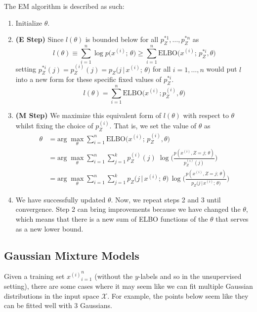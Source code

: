 \begin{definition}
    The EM algorithm is described as such: 
    \begin{enumerate}
      \item Initialize $\theta$.
      \item \textbf{(E Step)} Since $l(\theta)$ is bounded below for all $p_Z^{*1}, \ldots, p_Z^{*n}$ as 
        \[l(\theta) \equiv \sum_{i=1}^n \log p\big( x^{(i)}; \, \theta\big) \geq \sum_{i=1}^n \text{ELBO}\big( x^{(i)}; \, p_Z^{*i}, \theta\big)\]
      setting $p_Z^{*i} (j) = p_Z^{(i)} (j) = p_Z \big(j\,|\, x^{(i)}; \, \theta\big)$ for all $i = 1, \ldots, n$ would put $l$ into a new form for these specific fixed values of $p_Z^{*i}$. 
        \[l(\theta) = \sum_{i=1}^n \text{ELBO}\big(x^{(i)}; p_Z^{(i)}, \theta \big)\]
      \item \textbf{(M Step)} We maximize this equivalent form of $l(\theta)$ with respect to $\theta$ whilst fixing the choice of $p_Z^{(i)}$. That is, we set the value of $\theta$ as 
      \begin{align*}  
        \theta & = \text{arg}\; \max_\theta \sum_{i=1}^n \text{ELBO} \big( x^{(i)}; \, p_Z^{(i)}, \theta \big) \\
        & = \text{arg}\; \max_\theta \sum_{i=1}^n \sum_{j=1}^k p_Z^{(i)} (j)\; \log \bigg( \frac{p(x^{(i)}, Z = j; \, \theta)}{p_Z^{(i)} (j)} \bigg) \\
        & = \text{arg}\; \max_\theta \sum_{i=1}^n \sum_{j = 1}^k p_Z \big(j\,|\, x^{(i)}; \, \theta \big)\, \log \bigg( \frac{p(x^{(i)}, Z = j; \, \theta)}{p_Z \big(j\,|\, x^{(i)}; \, \theta \big)} \bigg)
      \end{align*}
      \item We have successfully updated $\theta$. Now, we repeat steps 2 and 3 until convergence. Step 2 can bring improvements because we have changed the $\theta$, which means that there is a new sum of ELBO functions of the $\theta$ that serves as a new lower bound.
    \end{enumerate}
  \end{definition}

\subsection{Gaussian Mixture Models}

  Given a training set ${x^{(i)}}_{i=1}^n$ (without the $y$-labels and so in the unsupervised setting), there are some cases where it may seem like we can fit multiple Gaussian distributions in the input space $\mathcal{X}$. For example, the points below seem like they can be fitted well with 3 Gaussians.

